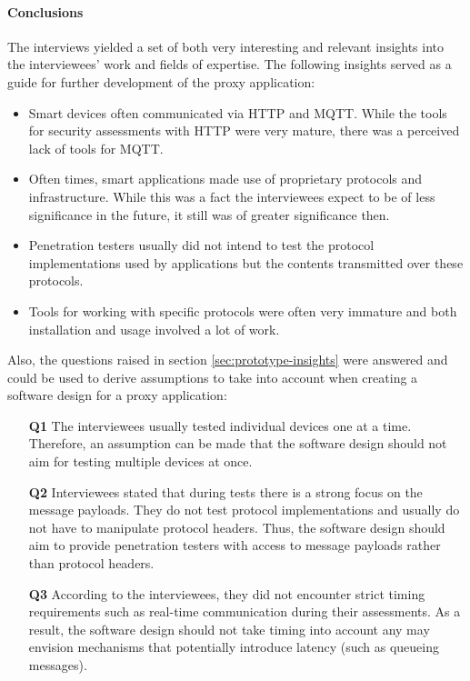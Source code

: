 \paragraph{Conclusions}
The interviews yielded a set of both very interesting and relevant insights into the interviewees' work and fields of expertise. The following insights served as a guide for further development of the proxy application:
\begin{itemize}
    \item Smart devices often communicated via \ac{HTTP} and \ac{MQTT}. While the tools for security assessments with \ac{HTTP} were very mature, there was a perceived lack of tools for \ac{MQTT}.
    \item Often times, smart applications made use of proprietary protocols and infrastructure. While this was a fact the interviewees expect to be of less significance in the future, it still was of greater significance then.
    \item Penetration testers usually did not intend to test the protocol implementations used by applications but the contents transmitted over these protocols.
    \item Tools for working with specific protocols were often very immature and both installation and usage involved a lot of work.
\end{itemize}
Also, the questions raised in section \ref{sec:prototype-insights} were answered and could be used to derive assumptions to take into account when creating a software design for a proxy application:
\begin{enumerate} %
    \item [\textbf{Q1}] The interviewees usually tested individual devices one at a time.
          Therefore, an assumption can be made that the software design should not aim for testing multiple devices at once.
    \item [\textbf{Q2}] Interviewees stated that during tests there is a strong focus on the message payloads. They do not test protocol implementations and usually do not have to manipulate protocol headers. Thus, the software design should aim to provide penetration testers with access to message payloads rather than protocol headers.
    \item [\textbf{Q3}] According to the interviewees, they did not encounter strict timing requirements such as real-time communication during their assessments. As a result, the software design should not take timing into account any may envision mechanisms that potentially introduce latency (such as queueing messages).
\end{enumerate}
